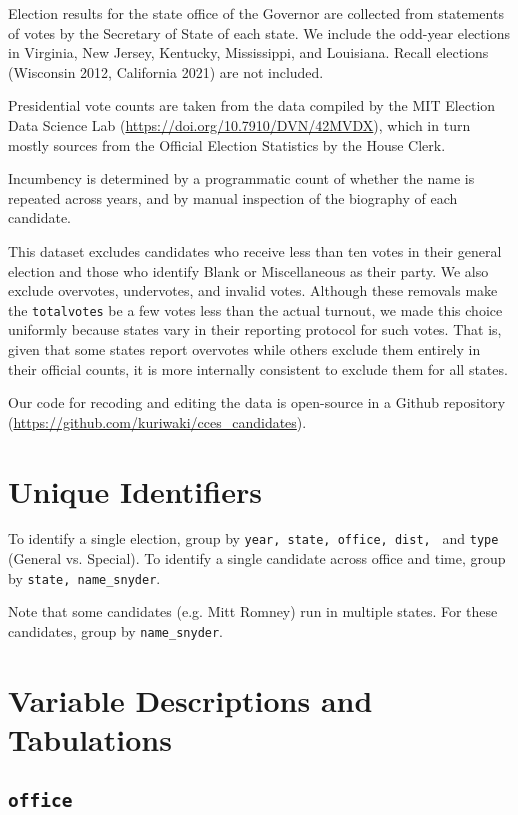 \documentclass[12pt]{article}
\begin{document}
Election results for the state office of the Governor are collected from statements of votes by the Secretary of State of each state. We include the odd-year elections in Virginia, New Jersey, Kentucky, Mississippi, and Louisiana. 
Recall elections (Wisconsin 2012, California 2021) are not included.

Presidential vote counts are taken from the data compiled by the MIT Election Data Science Lab (\url{https://doi.org/10.7910/DVN/42MVDX}), which in turn mostly sources from the Official Election Statistics by the House Clerk. 

Incumbency is determined by a programmatic count of whether the name is repeated across years, and by manual inspection of the biography of each candidate.

This dataset excludes candidates who receive less than ten votes in their general election and those who identify Blank or Miscellaneous as their party.
We also exclude overvotes, undervotes, and invalid votes.
Although these removals make the \texttt{totalvotes} be a few votes less than the actual turnout, we made this choice uniformly because states vary in their reporting protocol for such votes. That is, given that some states report overvotes while others exclude them entirely in their official counts, it is more internally consistent to exclude them for all states.

Our code for recoding and editing the data is open-source in a Github repository (\url{https://github.com/kuriwaki/cces_candidates}).


\section{Unique Identifiers}

To identify a single election, group by \texttt{year, state, office, dist, } and \texttt{type} (General vs. Special).  To identify a single candidate across office and time, group by \texttt{state, name\_snyder}. 

Note that some candidates (e.g. Mitt Romney) run in multiple states. For these candidates, group by \texttt{name\_snyder}. 
\section{Variable Descriptions and Tabulations}



\subsection*{\texttt{office}}
\end{document}

